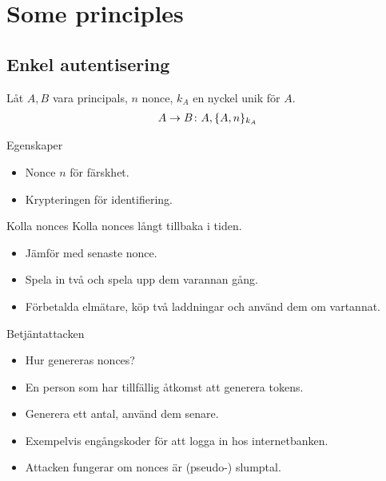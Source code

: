 \mode*




\section{Some principles}

\subsection{Enkel autentisering}

\begin{frame}
  \begin{example}
    Låt \(A, B\) vara principals, \(n\) nonce, \(k_A\) en nyckel unik för 
    \(A\).
    \begin{align*}
      A\to B\colon A, \{A, n\}_{k_A}
    \end{align*}
  \end{example}
  \begin{block}{Egenskaper}
    \begin{itemize}
      \item Nonce \(n\) för färskhet.
      \item Krypteringen för identifiering.
    \end{itemize}
  \end{block}
\end{frame}

\begin{frame}{Kolla nonces}
  Kolla nonces långt tillbaka i tiden.
  \begin{itemize}
    \item Jämför med senaste nonce.
    \item Spela in två och spela upp dem varannan gång.
    \item Förbetalda elmätare, köp två laddningar och använd dem om vartannat.
  \end{itemize}
\end{frame}

\begin{frame}{Betjäntattacken}
  \begin{itemize}
    \item Hur genereras nonces?
    \item En person som har tillfällig åtkomst att generera tokens.
    \item Generera ett antal, använd dem senare.
    \item Exempelvis engångskoder för att logga in hos internetbanken.
    \item Attacken fungerar om nonces är (pseudo-) slumptal.
  \end{itemize}
\end{frame}

